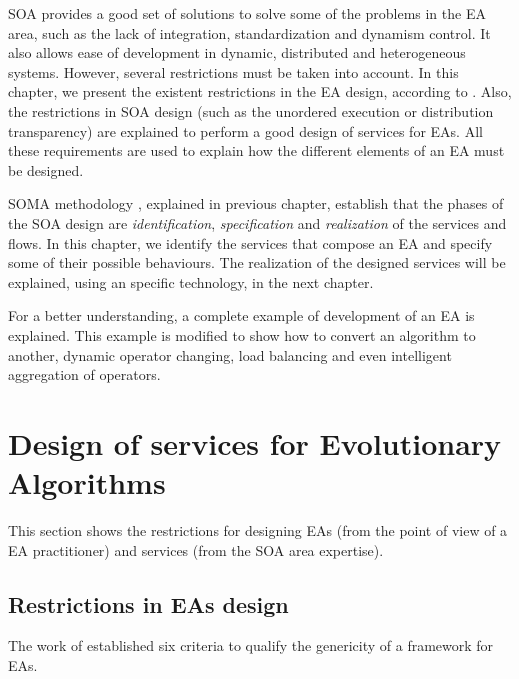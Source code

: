 \label{chap:soaea}
\minitoc\mtcskip
\vfill
\lettrine{S}{OA} provides a good set of solutions to solve some of the problems in the EA area, such as the lack of integration, standardization and dynamism control. It also allows ease of development in dynamic, distributed and heterogeneous systems. However, several restrictions must be taken into account. In this chapter, we present the existent restrictions in the EA design, according to  \cite{GENERICITY05}. Also, the restrictions in SOA design (such as the unordered execution or distribution transparency) are explained to perform a good design of services for EAs. All these requirements are used to explain how the different elements of an EA must be designed.

SOMA methodology \cite{Arsanjani2008SOMA}, explained in previous chapter, establish that the phases of the SOA design are {\em identification}, {\em specification} and {\em realization} of the services and flows. In this chapter, we identify the services that compose an EA and specify some of their possible behaviours. The realization of the designed services will be explained, using an specific technology, in the next chapter. 

For a better understanding, a complete example of development of an EA is explained. This example is modified to show how to convert an algorithm to another, dynamic operator changing, load balancing and even intelligent aggregation of operators.

\section{Design of services for Evolutionary Algorithms}

This section shows the restrictions for designing EAs (from the point of view of a EA practitioner) and services (from the SOA area expertise).

\subsection{Restrictions in EAs design}

The work of  \cite{GENERICITY05} established six criteria to qualify the genericity of a framework for EAs. 


